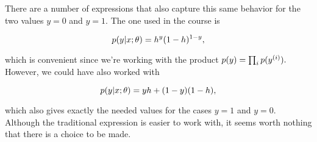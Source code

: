 \documentclass[]{article}
\begin{document}
There are a number of expressions that also capture this same behavior
for the two values \(y=0\) and \(y=1.\) The one used in the course is

\[p(y|x;\theta) = h^y(1-h)^{1-y},\]

which is convenient since we're working with the product
\(p(y) = \prod_i p(y^{(i)}).\) However, we could have also worked with

\[p(y|x;\theta) = yh + (1-y)(1-h),\]

which also gives exactly the needed values for the cases \(y=1\) and
\(y=0.\) Although the traditional expression is easier to work with, it
seems worth nothing that there is a choice to be made.

\hypertarget{refs}{}
\end{document}
